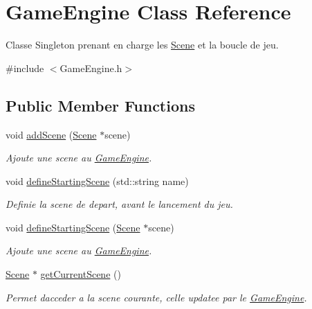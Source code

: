 \hypertarget{class_game_engine}{}\section{Game\+Engine Class Reference}
\label{class_game_engine}


Classe Singleton prenant en charge les \hyperlink{class_scene}{Scene} et la boucle de jeu.  




{\ttfamily \#include $<$Game\+Engine.\+h$>$}

\subsection*{Public Member Functions}
\begin{DoxyCompactItemize}
\item 
\hypertarget{class_game_engine_a5505704cb9ba58c5d029d8a736eff73d}{}\label{class_game_engine_a5505704cb9ba58c5d029d8a736eff73d} 
void \hyperlink{class_game_engine_a5505704cb9ba58c5d029d8a736eff73d}{add\+Scene} (\hyperlink{class_scene}{Scene} $\ast$scene)
\begin{DoxyCompactList}\small\item\em Ajoute une scene au \hyperlink{class_game_engine}{Game\+Engine}. \end{DoxyCompactList}\item 
void \hyperlink{class_game_engine_aba1c35007c56a3082102f67c08ea5580}{define\+Starting\+Scene} (std\+::string name)
\begin{DoxyCompactList}\small\item\em Definie la scene de depart, avant le lancement du jeu. \end{DoxyCompactList}\item 
void \hyperlink{class_game_engine_ad2bb379da2ce51978a989de4ca979ecb}{define\+Starting\+Scene} (\hyperlink{class_scene}{Scene} $\ast$scene)
\begin{DoxyCompactList}\small\item\em Ajoute une scene au \hyperlink{class_game_engine}{Game\+Engine}. \end{DoxyCompactList}\item 
\hyperlink{class_scene}{Scene} $\ast$ \hyperlink{class_game_engine_a8116aae790eaf236907d5d75401cd628}{get\+Current\+Scene} ()
\begin{DoxyCompactList}\small\item\em Permet d\textquotesingle{}acceder a la scene courante, celle updatee par le \hyperlink{class_game_engine}{Game\+Engine}. \end{DoxyCompactList}\item 

\end{DoxyCompactItemize}
